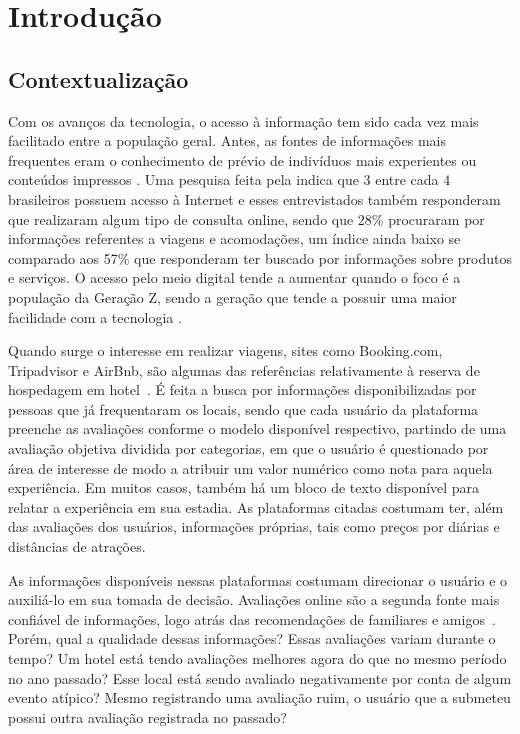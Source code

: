 
\chapter[Introdução]{Introdução}
\label{cap:intro}

\section{Contextualização}

Com os avanços da tecnologia, o acesso à informação tem sido cada vez mais facilitado entre a população geral. Antes, as fontes de informações mais frequentes eram o conhecimento de prévio de indivíduos mais experientes ou conteúdos impressos \cite{jayathilake2021critical}. Uma pesquisa feita pela  indica que 3 entre cada 4 brasileiros possuem acesso à Internet e esses entrevistados também responderam que realizaram algum tipo de consulta online, sendo que 28\% procuraram por informações referentes a viagens e acomodações, um índice ainda baixo se comparado aos 57\% que responderam ter buscado por informações sobre produtos e serviços. O acesso pelo meio digital tende a aumentar quando o foco é a população da Geração Z, sendo a geração que tende a possuir uma maior facilidade com a tecnologia \cite{sfodera2022technology}.

Quando surge o interesse em realizar viagens, sites como Booking.com, Tripadvisor e AirBnb, são algumas das referências relativamente à reserva de hospedagem em hotel~. É feita a busca por informações disponibilizadas por pessoas que já frequentaram os locais, sendo que cada usuário da plataforma preenche as avaliações conforme o modelo disponível respectivo, partindo de uma avaliação objetiva dividida por categorias, em que o usuário é questionado por área de interesse de modo a atribuir um valor numérico como nota para aquela experiência. Em muitos casos, também há um bloco de texto disponível para relatar a experiência em sua estadia. As plataformas citadas costumam ter, além das avaliações dos usuários, informações próprias, tais como preços por diárias e distâncias de atrações.

As informações disponíveis nessas plataformas costumam direcionar o usuário e o auxiliá-lo em sua tomada de decisão. Avaliações online são a segunda fonte mais confiável de informações, logo atrás das recomendações de familiares e amigos~\cite{chatterjee2020drivers}. Porém, qual a qualidade dessas informações? Essas avaliações variam durante o tempo? Um hotel está tendo avaliações melhores agora do que no mesmo período no ano passado? Esse local está sendo avaliado negativamente por conta de algum evento atípico? Mesmo registrando uma avaliação ruim, o usuário que a submeteu possui outra avaliação registrada no passado?

